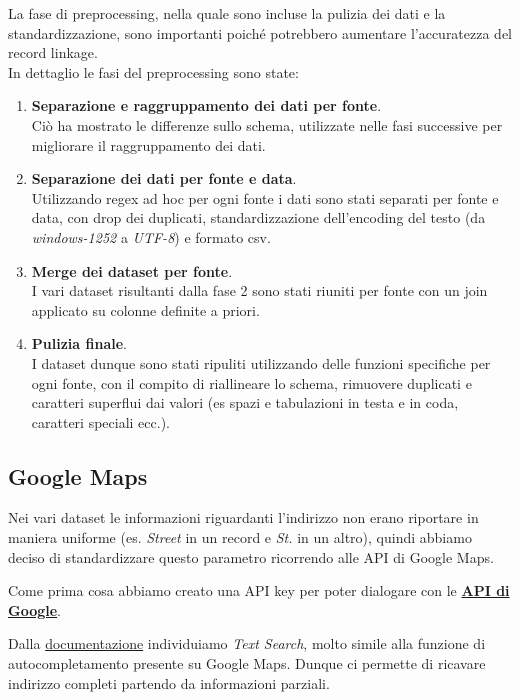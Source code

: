 \documentclass[a4paper,12pt]{article}
\begin{document}
\noindent La fase di preprocessing, nella quale sono incluse la pulizia dei dati e la standardizzazione, sono importanti poiché potrebbero aumentare l'accuratezza del record linkage.\\
In dettaglio le fasi del preprocessing sono state: %
\begin{enumerate}
	\item \textbf{Separazione e raggruppamento dei dati per fonte}.\\Ciò ha mostrato le differenze sullo schema, utilizzate nelle fasi successive per migliorare il raggruppamento dei dati.
	\item \textbf{Separazione dei dati per fonte e data}.\\Utilizzando regex ad hoc per ogni fonte i dati sono stati separati per fonte e data, con drop dei duplicati, standardizzazione dell'encoding del testo (da \textit{windows-1252} a \textit{UTF-8}) e formato csv.
	\item \textbf{Merge dei dataset per fonte}.\\I vari dataset risultanti dalla fase 2 sono stati riuniti per fonte con un join applicato su colonne definite a priori. 
	\item \textbf{Pulizia finale}.\\I dataset dunque sono stati ripuliti utilizzando delle funzioni specifiche per ogni fonte, con il compito di riallineare lo schema, rimuovere duplicati e caratteri superflui dai valori (es spazi e tabulazioni in testa e in coda, caratteri speciali ecc.).  
\end{enumerate}

\subsection{Google Maps}
Nei vari dataset le informazioni riguardanti l'indirizzo non erano riportare in maniera uniforme (es. \textit{Street} in un record e \textit{St.} in un altro), quindi abbiamo deciso di standardizzare questo parametro ricorrendo alle API di Google Maps.

\noindent Come prima cosa abbiamo creato una API key per poter dialogare con le 
\textbf{\href{https://console.cloud.google.com/google/maps-apis/overview?project=feisty-nectar-281812&folder=&organizationId=}{API di Google}}.


\noindent Dalla \href{https://developers.google.com/places/web-service/search}{documentazione} individuiamo \textit{Text Search}, molto simile alla funzione di autocompletamento presente su Google Maps. Dunque ci permette di ricavare indirizzo completi partendo da informazioni parziali.
\end{document}
